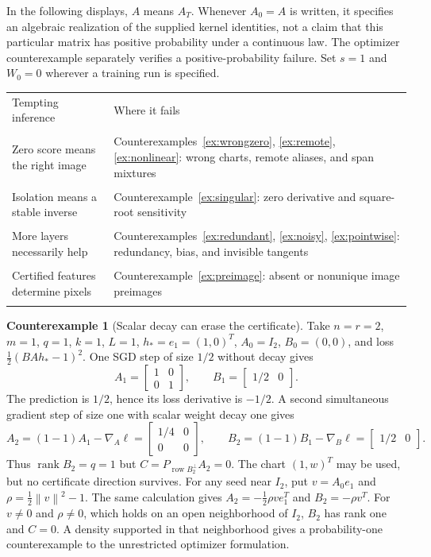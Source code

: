 \documentclass[11pt,a4paper]{article}
\theoremstyle{definition}
\theoremstyle{definition}
\newtheorem{example}[theorem]{Counterexample}
\theoremstyle{remark}\newtheorem{remark}[theorem]{Remark}
\newcommand{\row}{\operatorname{row}}\newcommand{\rank}{\operatorname{rank}}
\newcommand{\norm}[1]{\left\lVert #1\right\rVert}
\begin{document}
In the following displays, $A$ means $A_T$. Whenever $A_0=A$ is written, it specifies an algebraic realization of the supplied kernel identities, not a claim that this particular matrix has positive probability under a continuous law. The optimizer counterexample separately verifies a positive-probability failure. Set $s=1$ and $W_0=0$ wherever a training run is specified.

\begin{center}
\small
\begin{tabular}{@{}Y{.40\textwidth}Y{.50\textwidth}@{}}
\toprule
Tempting inference & Where it fails\\\\
\midrule
Zero score means the right image & Counterexamples~\ref{ex:wrongzero}, \ref{ex:remote}, \ref{ex:nonlinear}: wrong charts, remote aliases, and span mixtures\\\\[4pt]
Isolation means a stable inverse & Counterexample~\ref{ex:singular}: zero derivative and square-root sensitivity\\\\[4pt]
More layers necessarily help & Counterexamples~\ref{ex:redundant}, \ref{ex:noisy}, \ref{ex:pointwise}: redundancy, bias, and invisible tangents\\\\[4pt]
Certified features determine pixels & Counterexample~\ref{ex:preimage}: absent or nonunique image preimages\\\\
\bottomrule
\end{tabular}
\end{center}

\begin{example}[Scalar decay can erase the certificate]\label{ex:decay}
Take $n=r=2$, $m=1$, $q=1$, $k=1$, $L=1$, $h_*=e_1=(1,0)^T$, $A_0=I_2$, $B_0=(0,0)$, and loss $\frac12(BAh_*-1)^2$. One SGD step of size $1/2$ without decay gives
\[
A_1=\begin{bmatrix}1&0\\0&1\end{bmatrix},\qquad B_1=\begin{bmatrix}1/2&0\end{bmatrix}.
\]
The prediction is $1/2$, hence its loss derivative is $-1/2$. A second simultaneous gradient step of size one with scalar weight decay one gives
\[
A_2=(1-1)A_1-\nabla_A\ell
=\begin{bmatrix}1/4&0\\0&0\end{bmatrix},\qquad
B_2=(1-1)B_1-\nabla_B\ell=\begin{bmatrix}1/2&0\end{bmatrix}.
\]
Thus $\rank B_2=q=1$ but $C=P_{\row B_2^\perp}A_2=0$. The chart $(1,w)^T$ may be used, but no certificate direction survives. For any seed near $I_2$, put $v=A_0e_1$ and $\rho=\frac12\norm v^2-1$. The same calculation gives $A_2=-\frac12\rho v e_1^T$ and $B_2=-\rho v^T$. For $v\ne0$ and $\rho\ne0$, which holds on an open neighborhood of $I_2$, $B_2$ has rank one and $C=0$. A density supported in that neighborhood gives a probability-one counterexample to the unrestricted optimizer formulation.
\end{example}
\end{document}
